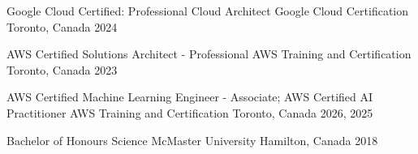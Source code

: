 
\begin{cvhonors}

  \cvhonor
    {Google Cloud Certified: Professional Cloud Architect} %
    {Google Cloud Certification} %
    {Toronto, Canada} %
    {2024} %

  \cvhonor
    {AWS Certified Solutions Architect - Professional} %
    {AWS Training and Certification} %
    {Toronto, Canada} %
    {2023} %

  \cvhonor
    {AWS Certified Machine Learning Engineer - Associate; AWS Certified AI Practitioner} %
    {AWS Training and Certification} %
    {Toronto, Canada} %
    {2026, 2025} %

  \cvhonor
    {Bachelor of Honours Science} %
    {McMaster University} %
    {Hamilton, Canada} %
    {2018} %

\end{cvhonors}
